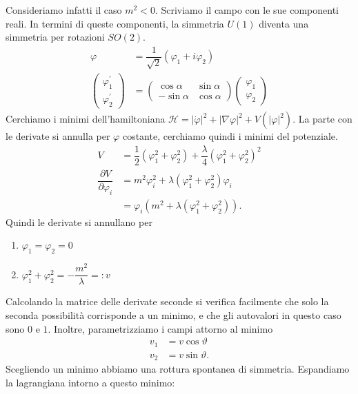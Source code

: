 \documentclass[italian,a4paper]{article}
\theoremstyle{definition}
\renewcommand{\theta}{\vartheta}
\begin{document}
Consideriamo infatti il caso $m^2 < 0$.
Scriviamo il campo con le sue componenti reali. In termini di queste
componenti, la simmetria $U(1)$ diventa una simmetria per rotazioni $SO(2)$.
\begin{align*}
    \varphi &= \dfrac{1}{\sqrt{2}}(\varphi_1 + i \varphi_2)\\
    \begin{pmatrix}
        \varphi_1^\prime\\
        \varphi_2^\prime
    \end{pmatrix} &= 
    \begin{pmatrix}
        \cos \alpha & \sin \alpha \\
        -\sin \alpha & \cos \alpha
    \end{pmatrix}
    \begin{pmatrix}
        \varphi_1\\
        \varphi_2
    \end{pmatrix}
\end{align*}
Cerchiamo i minimi dell'hamiltoniana $\mathscr H = |\dot\varphi|^2 + |\nabla
\varphi|^2 + V(|\varphi|^2)$. La parte con le derivate si annulla per
$\varphi$ costante, cerchiamo quindi i minimi del potenziale.
\begin{align*}
    V &=\dfrac{1}{2}(\varphi_1^2 + \varphi_2^2) +
    \dfrac{\lambda}{4}(\varphi_1^2 + \varphi_2^2)^2\\
    \dfrac{\partial V}{\partial \varphi_i} &= m^2 \varphi_i ^ 2 +
    \lambda(\varphi_1^2 + \varphi_2^2)\varphi_i\\
    &= \varphi_i (m^2 + \lambda(\varphi_1^2 + \varphi_2^2)).
\end{align*}
Quindi le derivate si annullano per 
\begin{enumerate}
    \item $\varphi_1 = \varphi_2 = 0$
    \item $\varphi_1^2 + \varphi_2^2 = - \dfrac{m^2}{\lambda} = \mathop: v$
\end{enumerate}
Calcolando la matrice delle derivate
seconde si verifica facilmente che solo la seconda possibilit\`a corrisponde
a un minimo, e che gli autovalori in questo caso sono $0$ e $1$. Inoltre,
parametrizziamo i campi attorno al minimo
\begin{align*}
    v_1 &=v \cos \theta\\
    v_2 &=v \sin \theta.
\end{align*}
Scegliendo un minimo abbiamo una rottura spontanea di simmetria. Espandiamo
la lagrangiana intorno a questo minimo:
\end{document}
